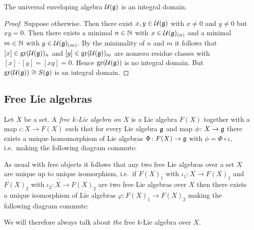 \begin{cor}
 The universal enveloping algebra $\mathcal{U}(\mathfrak{g})$ is an integral domain.
\end{cor}
\begin{proof}
 Suppose otherwise. Then there exist $x,y \in \mathcal{U}(\mathfrak{g})$ with $x \neq 0$ and $y \neq 0$ but $xy = 0$. Then there exists a minimal $n \in \mathbb{N}$ with $x \in \mathcal{U}(\mathfrak{g})_{(n)}$ and a minimal $m \in \mathbb{N}$ with $y \in \mathcal{U}(\mathfrak{g})_{(m)}$. By the minimality of $n$ and $m$ it follows that $[x] \in \operatorname{gr}(\mathcal{U}(\mathfrak{g}))_n$ and $[y] \in \operatorname{gr}(\mathcal{U}(\mathfrak{g}))_m$ are nonzero residue classes with $[x] \cdot [y] = [xy] = 0$. Hence $\operatorname{gr}(\mathcal{U}(\mathfrak{g}))$ is no integral domain. But $\operatorname{gr}(\mathcal{U}(\mathfrak{g})) \cong S(\mathfrak{g})$ is an integral domain.
\end{proof}





\subsection{Free Lie algebras}


\begin{defi}
 Let $X$ be a set. A \emph{free $k$-Lie algebra on $X$} is a Lie algebra $F(X)$ together with a map $\iota \colon X \to F(X)$ such that for every Lie algebra $\mathfrak{g}$ and map $\phi \colon X \to \mathfrak{g}$ there exists a unique homomorphism of Lie algebras $\Phi \colon F(X) \to \mathfrak{g}$ with $\phi = \Phi \circ \iota$, i.e.\ making the following diagram commute:
 \begin{center}
 \end{center}
\end{defi}


\begin{rem}
 As usual with free objects it follows that any two free Lie algebras over a set $X$ are unique up to unique isomorphism, i.e.\ if $F(X)_1$ with $\iota_1 \colon X \to F(X)_1$ and $F(X)_2$ with $\iota_2 \colon X \to F(X)_2$ are two free Lie algebras over $X$ then there exists a unique isomorphism of Lie algebras $\varphi \colon F(X)_1 \to F(X)_2$ making the following diagram commute:
 \begin{center}
 \end{center}
 We will therefore always talk about \emph{the} free $k$-Lie algebra over $X$.
\end{rem}


